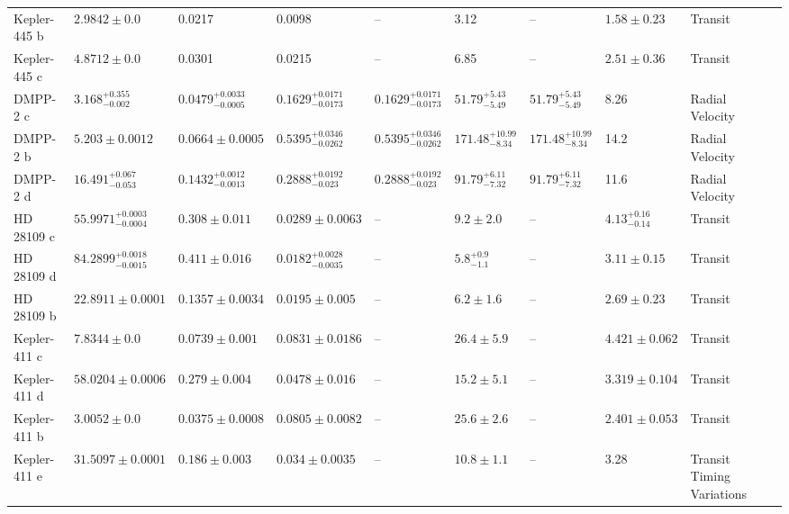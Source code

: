 \begin{tabular}{llllllllll}
Kepler-445 b & $2.9842 \pm 0.0$ & 0.0217 & 0.0098 & -- & 3.12 & -- & $1.58 \pm 0.23$ & Transit & \cite{MUIRHEAD_ET_AL__2015} \\
Kepler-445 c & $4.8712 \pm 0.0$ & 0.0301 & 0.0215 & -- & 6.85 & -- & $2.51 \pm 0.36$ & Transit & \cite{MUIRHEAD_ET_AL__2015} \\
DMPP-2 c & $3.168^{+0.355}_{-0.002}$ & $0.0479^{+0.0033}_{-0.0005}$ & $0.1629^{+0.0171}_{-0.0173}$ & $0.1629^{+0.0171}_{-0.0173}$ & $51.79^{+5.43}_{-5.49}$ & $51.79^{+5.43}_{-5.49}$ & 8.26 & Radial Velocity & \cite{STANDING_ET_AL_2026} \\
DMPP-2 b & $5.203 \pm 0.0012$ & $0.0664 \pm 0.0005$ & $0.5395^{+0.0346}_{-0.0262}$ & $0.5395^{+0.0346}_{-0.0262}$ & $171.48^{+10.99}_{-8.34}$ & $171.48^{+10.99}_{-8.34}$ & 14.2 & Radial Velocity & \cite{STANDING_ET_AL_2026} \\
DMPP-2 d & $16.491^{+0.067}_{-0.053}$ & $0.1432^{+0.0012}_{-0.0013}$ & $0.2888^{+0.0192}_{-0.023}$ & $0.2888^{+0.0192}_{-0.023}$ & $91.79^{+6.11}_{-7.32}$ & $91.79^{+6.11}_{-7.32}$ & 11.6 & Radial Velocity & \cite{STANDING_ET_AL_2026} \\
HD 28109 c & $55.9971^{+0.0003}_{-0.0004}$ & $0.308 \pm 0.011$ & $0.0289 \pm 0.0063$ & -- & $9.2 \pm 2.0$ & -- & $4.13^{+0.16}_{-0.14}$ & Transit & \cite{BARONE_ET_AL_2025} \\
HD 28109 d & $84.2899^{+0.0018}_{-0.0015}$ & $0.411 \pm 0.016$ & $0.0182^{+0.0028}_{-0.0035}$ & -- & $5.8^{+0.9}_{-1.1}$ & -- & $3.11 \pm 0.15$ & Transit & \cite{BARONE_ET_AL_2025} \\
HD 28109 b & $22.8911 \pm 0.0001$ & $0.1357 \pm 0.0034$ & $0.0195 \pm 0.005$ & -- & $6.2 \pm 1.6$ & -- & $2.69 \pm 0.23$ & Transit & \cite{BARONE_ET_AL_2025} \\
Kepler-411 c & $7.8344 \pm 0.0$ & $0.0739 \pm 0.001$ & $0.0831 \pm 0.0186$ & -- & $26.4 \pm 5.9$ & -- & $4.421 \pm 0.062$ & Transit & \cite{SUN_ET_AL__2019} \\
Kepler-411 d & $58.0204 \pm 0.0006$ & $0.279 \pm 0.004$ & $0.0478 \pm 0.016$ & -- & $15.2 \pm 5.1$ & -- & $3.319 \pm 0.104$ & Transit & \cite{SUN_ET_AL__2019} \\
Kepler-411 b & $3.0052 \pm 0.0$ & $0.0375 \pm 0.0008$ & $0.0805 \pm 0.0082$ & -- & $25.6 \pm 2.6$ & -- & $2.401 \pm 0.053$ & Transit & \cite{SUN_ET_AL__2019} \\
Kepler-411 e & $31.5097 \pm 0.0001$ & $0.186 \pm 0.003$ & $0.034 \pm 0.0035$ & -- & $10.8 \pm 1.1$ & -- & 3.28 & Transit Timing Variations & \cite{SUN_ET_AL__2019} \\

\end{tabular}
